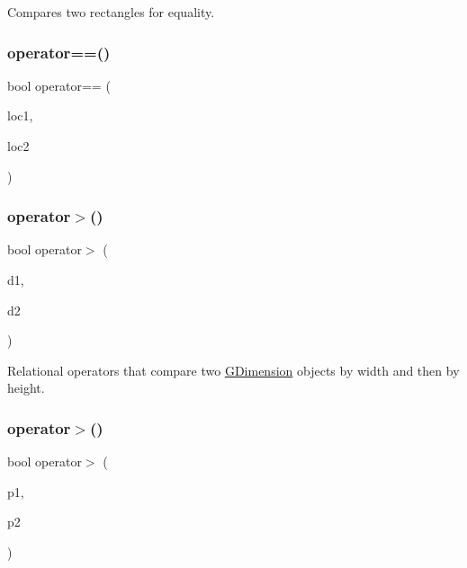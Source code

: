 Compares two rectangles for equality. 

\mbox{\label{namespacesgl_ae0dd643b547084bebfd6ec199fea1026}} 
\subsubsection{\texorpdfstring{operator==()}{operator==()}\hspace{0.1cm}{\footnotesize\ttfamily [4/4]}}
{\footnotesize\ttfamily bool operator== (\begin{DoxyParamCaption}\item[{const \mbox{\hyperlink{structsgl_1_1GTableIndex}{G\+Table\+Index}} \&}]{loc1,  }\item[{const \mbox{\hyperlink{structsgl_1_1GTableIndex}{G\+Table\+Index}} \&}]{loc2 }\end{DoxyParamCaption})}

\mbox{\label{namespacesgl_a9a2ff65ec3535534d2087f7a29ddf1e8}} 
\subsubsection{\texorpdfstring{operator$>$()}{operator>()}\hspace{0.1cm}{\footnotesize\ttfamily [1/4]}}
{\footnotesize\ttfamily bool operator$>$ (\begin{DoxyParamCaption}\item[{const \mbox{\hyperlink{structsgl_1_1GDimension}{G\+Dimension}} \&}]{d1,  }\item[{const \mbox{\hyperlink{structsgl_1_1GDimension}{G\+Dimension}} \&}]{d2 }\end{DoxyParamCaption})}



Relational operators that compare two \mbox{\hyperlink{structsgl_1_1GDimension}{G\+Dimension}} objects by width and then by height. 

\mbox{\label{namespacesgl_a2ef77d4bff099bb0440be3bde3341bd1}} 
\subsubsection{\texorpdfstring{operator$>$()}{operator>()}\hspace{0.1cm}{\footnotesize\ttfamily [2/4]}}
{\footnotesize\ttfamily bool operator$>$ (\begin{DoxyParamCaption}\item[{const \mbox{\hyperlink{structsgl_1_1GPoint}{G\+Point}} \&}]{p1,  }\item[{const \mbox{\hyperlink{structsgl_1_1GPoint}{G\+Point}} \&}]{p2 }\end{DoxyParamCaption})}



